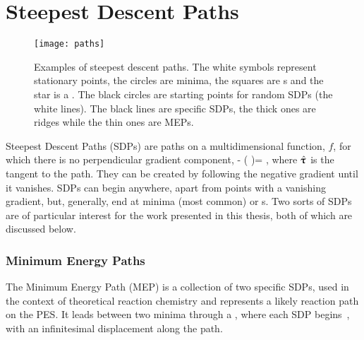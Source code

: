 \section{Steepest Descent Paths}
\label{sec:sdps}

\begin{figure}[h]
  \begin{center}
    \texttt{[image: paths]}
    \parbox{0.85\linewidth}{
      \caption{Examples of steepest descent paths.
The white symbols represent stationary points, the circles are minima, the squares are s and the star is a .
The black circles are starting points for random SDPs (the white lines).
The black lines are specific SDPs, the thick ones are ridges while the thin ones are MEPs.
      }
      \label{fig:paths}
    }
  \end{center}
\end{figure}

Steepest Descent Paths (SDPs) are paths on a multidimensional function, $f$, for which there is no perpendicular gradient component,
\nabla {} - (\nabla {} \cdot \uvt)\uvt = ,
\eeq
where $\hat{{\mathrm{\mathbf{\bm{\uptau}}}}}$ is the tangent to the path.
They can be created by following the negative gradient until it vanishes.
SDPs can begin anywhere, apart from points with a vanishing gradient, but, generally, end at minima (most common) or \sap{}s.
Two sorts of SDPs are of particular interest for the work presented in this thesis, both of which are discussed below.


\subsubsection{Minimum Energy Paths}


The Minimum Energy Path (MEP) is a collection of two specific SDPs, used in the context of theoretical reaction chemistry and represents a likely reaction path on the PES.
It leads between two minima through a , where each SDP begins~\cite{neb-polemic-henkelman1}, with an infinitesimal displacement along the path.

